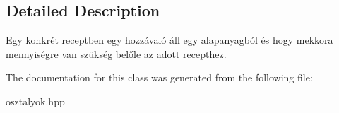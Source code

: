 \subsection{Detailed Description}
Egy konkrét receptben egy hozzávaló áll egy alapanyagból és hogy mekkora mennyiségre van szükség belőle az adott recepthez. 

The documentation for this class was generated from the following file\+:\begin{DoxyCompactItemize}
\item 
osztalyok.\+hpp\end{DoxyCompactItemize}
